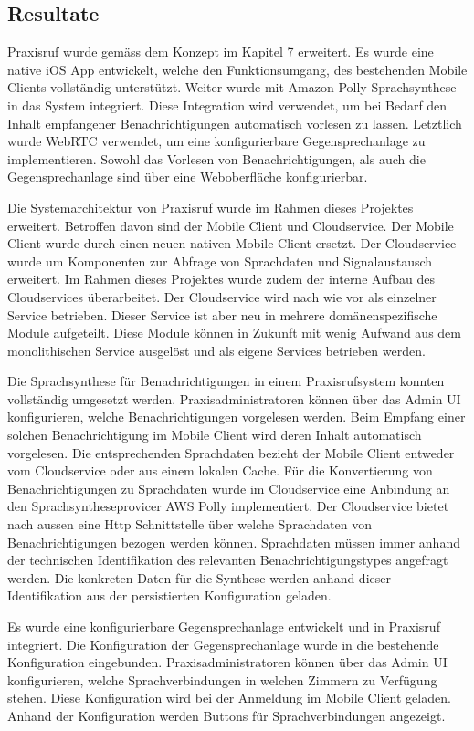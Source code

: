 \subsection{Resultate}

Praxisruf wurde gemäss dem Konzept im Kapitel 7 erweitert.
Es wurde eine native iOS App entwickelt, welche den Funktionsumgang, des bestehenden Mobile Clients vollständig unterstützt.
Weiter wurde mit Amazon Polly Sprachsynthese in das System integriert.
Diese Integration wird verwendet, um bei Bedarf den Inhalt empfangener Benachrichtigungen automatisch vorlesen zu lassen.
Letztlich wurde WebRTC verwendet, um eine konfigurierbare Gegensprechanlage zu implementieren.
Sowohl das Vorlesen von Benachrichtigungen, als auch die Gegensprechanlage sind über eine Weboberfläche konfigurierbar.

Die Systemarchitektur von Praxisruf wurde im Rahmen dieses Projektes erweitert.
Betroffen davon sind der Mobile Client und Cloudservice.
Der Mobile Client wurde durch einen neuen nativen Mobile Client ersetzt.
Der Cloudservice wurde um Komponenten zur Abfrage von Sprachdaten und Signalaustausch erweitert.
Im Rahmen dieses Projektes wurde zudem der interne Aufbau des Cloudservices überarbeitet.
Der Cloudservice wird nach wie vor als einzelner Service betrieben.
Dieser Service ist aber neu in mehrere domänenspezifische Module aufgeteilt.
Diese Module können in Zukunft mit wenig Aufwand aus dem monolithischen Service ausgelöst und als eigene Services betrieben werden.

Die Sprachsynthese für Benachrichtigungen in einem Praxisrufsystem konnten vollständig umgesetzt werden.
Praxisadministratoren können über das Admin UI konfigurieren, welche Benachrichtigungen vorgelesen werden.
Beim Empfang einer solchen Benachrichtigung im Mobile Client wird deren Inhalt automatisch vorgelesen.
Die entsprechenden Sprachdaten bezieht der Mobile Client entweder vom Cloudservice oder aus einem lokalen Cache.
Für die Konvertierung von Benachrichtigungen zu Sprachdaten wurde im Cloudservice eine Anbindung an den Sprachsyntheseprovicer AWS Polly implementiert.
Der Cloudservice bietet nach aussen eine Http Schnittstelle über welche Sprachdaten von Benachrichtigungen bezogen werden können.
Sprachdaten müssen immer anhand der technischen Identifikation des relevanten Benachrichtigungstypes angefragt werden.
Die konkreten Daten für die Synthese werden anhand dieser Identifikation aus der persistierten Konfiguration geladen.

Es wurde eine konfigurierbare Gegensprechanlage entwickelt und in Praxisruf integriert.
Die Konfiguration der Gegensprechanlage wurde in die bestehende Konfiguration eingebunden.
Praxisadministratoren können über das Admin UI konfigurieren, welche Sprachverbindungen in welchen Zimmern zu Verfügung stehen.
Diese Konfiguration wird bei der Anmeldung im Mobile Client geladen.
Anhand der Konfiguration werden Buttons für Sprachverbindungen angezeigt.

